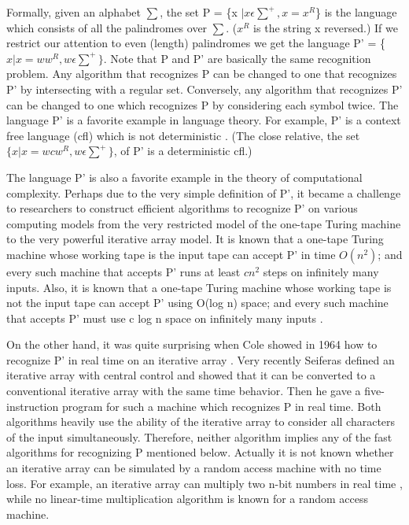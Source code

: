 \documentclass[11pt,a4paper]{report}
\begin{document}
Formally, given an alphabet $\sum$, the set P = \{x $| x \epsilon \sum^{+}, x = x^R$\} is the language
which consists of all the palindromes over $\sum$. ($x^R$ is the string x reversed.) If we restrict
our attention to even (length) palindromes we get the language P’ = \{$x | x = ww^R,w \epsilon \sum^{+}\}$. 
Note that P and P’ are basically the same recognition problem. Any algorithm
that recognizes P can be changed to one that recognizes P’ by intersecting with a regular
set. Conversely, any algorithm that recognizes P’ can be changed to one which recognizes
P by considering each symbol twice.
The language P’ is a favorite example in language theory. For example, P’ is a context free language (cfl) which is not deterministic \cite{hopcroft}. (The close relative, the set 
$\{x| x =wcw^R, w \epsilon \sum^{+}\}$, of P’ is a deterministic cfl.)


The language P’ is also a favorite example in the theory of computational complexity.
Perhaps due to the very simple definition of P’, it became a challenge to researchers to
construct efficient algorithms to recognize P’ on various computing models from the very
restricted model of the one-tape Turing machine to the very powerful iterative array
model. It is known that a one-tape Turing machine whose working tape is the input tape
can accept P’ in time $O(n^{2})$; and every such machine that accepts P’ runs at least $cn^{2}$
steps on infinitely many inputs. Also, it is known that a one-tape Turing machine whose
working tape is not the input tape can accept P’ using O(log n) space; and every such
machine that accepts P’ must use c log n space on infinitely many inputs \cite{hopcroft}.

On the other hand, it was quite surprising when Cole showed in 1964 how to recognize
P’ in real time on an iterative array \cite{cole}. Very recently Seiferas \cite{seiferas} defined
an iterative array with central control and showed that it can be converted to a conventional
iterative array with the same time behavior. Then he gave a five-instruction program for
such a machine which recognizes P in real time. Both algorithms heavily use the ability
of the iterative array to consider all characters of the input simultaneously. Therefore,
neither algorithm implies any of the fast algorithms for recognizing P mentioned below.
Actually it is not known whether an iterative array can be simulated by a random access
machine with no time loss. For example, an iterative array can multiply two n-bit numbers
in real time \cite{multiply}, while no linear-time multiplication algorithm is known for a random
access machine.
\end{document}
